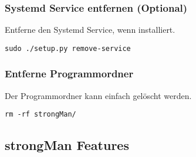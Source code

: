 \subsubsection{Systemd Service entfernen (Optional)}
Entferne den Systemd Service, wenn installiert.
\begin{lstlisting}[style=BashInputStyle]
    sudo ./setup.py remove-service
\end{lstlisting}

\subsubsection{Entferne Programmordner}
Der Programmordner kann einfach gelöscht werden.
\begin{lstlisting}[style=BashInputStyle]
    rm -rf strongMan/
\end{lstlisting}

\subsection{strongMan Features}
